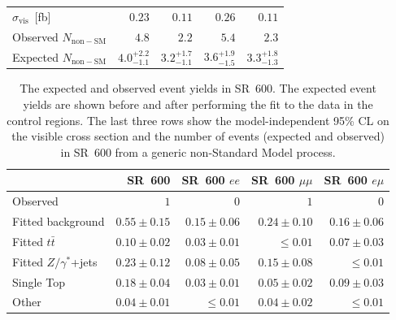 \begin{table}
\begin{center}
\begin{tabular}{lrrrr}
      \midrule
      $\sigma_\mathrm{vis}$~[fb]    & $0.23$                & $0.11$                & $0.26$                & $0.11$                \\
      Observed $N_\mathrm{non-SM}$  & $4.8$                 & $2.2$                 & $5.4$                 & $2.3$                 \\
      Expected $N_\mathrm{non-SM}$  & ${4.0}^{+2.2}_{-1.1}$ & ${3.2}^{+1.7}_{-1.1}$ & ${3.6}^{+1.9}_{-1.5}$ & ${3.3}^{+1.8}_{-1.3}$ \\
      \bottomrule
    \end{tabular}
  \end{center}
\end{table}

\begin{table}
  \caption{The expected and observed event yields in SR~600. The expected event
    yields are shown before and after performing the fit to the data in the
    control regions.  The last three rows show the model-independent 95\% CL on
    the visible cross section and the number of events (expected and observed)
    in SR~600 from a generic non-Standard Model process.
  }
  \label{tab:event_yields_sr_600}
  \begin{center}
    \begin{tabular}{lrrrr}
      \toprule
                                     & SR~600                & SR~600 $ee$           & SR~600 $\mu\mu$       & SR~600 $e\mu$   \\
      \midrule
      Observed                       & $1$                   & $0$                   & $1$                   & $0$              \\
      \midrule
      Fitted background              & $0.55 \pm 0.15$       & $0.15 \pm 0.06$       & $0.24 \pm 0.10$       & $0.16 \pm 0.06$  \\
      \midrule
      Fitted $t\bar{t}$              & $0.10 \pm 0.02$       & $0.03 \pm 0.01$       & $\leq 0.01$           & $0.07 \pm 0.03$  \\
      Fitted $Z/\gamma^{*}$+jets     & $0.23 \pm 0.12$       & $0.08 \pm 0.05$       & $0.15 \pm 0.08$       & $\leq 0.01$  \\
      Single Top                     & $0.18 \pm 0.04$       & $0.03 \pm 0.01$       & $0.05 \pm 0.02$       & $0.09 \pm 0.03$  \\
      Other                          & $0.04 \pm 0.01$       & $\leq 0.01$           & $0.04 \pm 0.02$       & $\leq 0.01$  \\

\end{tabular}
\end{center}
\end{table}
